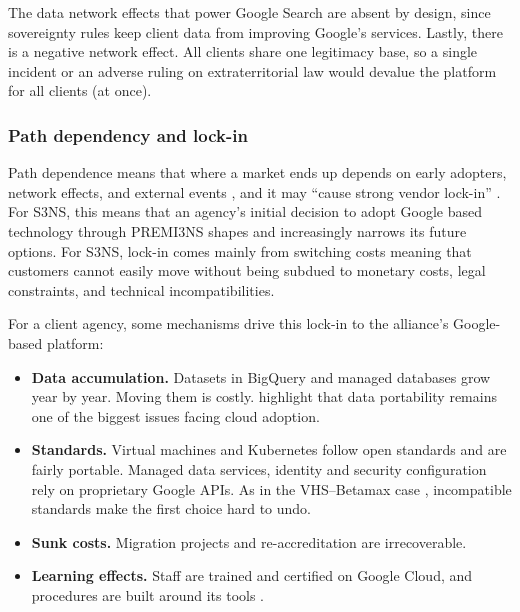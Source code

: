 The data network effects that power Google Search \parencite[p.~135]{overby2021} are absent by design, since sovereignty rules keep client data from improving Google's services. Lastly, there is a negative network effect. All clients share one legitimacy base, so a single incident or an adverse ruling on extraterritorial law would devalue the platform for all clients (at once). 


\subsubsection{Path dependency and lock-in}
\label{sec:PathDependency}

Path dependence means that where a market ends up depends on early adopters, network effects, and external events \parencite[p.~167]{overby2021}, and it may ``cause strong vendor lock-in'' \parencite[p.~172]{overby2021}. For S3NS, this means that an agency's initial decision to adopt Google based technology through PREMI3NS shapes and increasingly narrows its future options. For S3NS, lock-in comes mainly from switching costs meaning that customers cannot easily move without being subdued to monetary costs, legal constraints, and technical incompatibilities.

For a client agency, some mechanisms drive this lock-in to the alliance's Google-based platform:

\begin{itemize}
    \item \textbf{Data accumulation.} Datasets in BigQuery and managed databases grow year by year. Moving them is costly. \textcite{oparamartins2016} highlight that data portability remains one of the biggest issues facing cloud adoption.

    \item \textbf{Standards.} Virtual machines and Kubernetes follow open standards and are fairly portable. Managed data services, identity and security configuration rely on proprietary Google APIs. As in the VHS--Betamax case \parencite[pp.~168--169]{overby2021}, incompatible standards make the first choice hard to undo.

    \item \textbf{Sunk costs.} Migration projects and re-accreditation are irrecoverable.     

    \item \textbf{Learning effects.} Staff are trained and certified on Google Cloud, and procedures are built around its tools \parencite[p.~181]{overby2021}.
\end{itemize}

